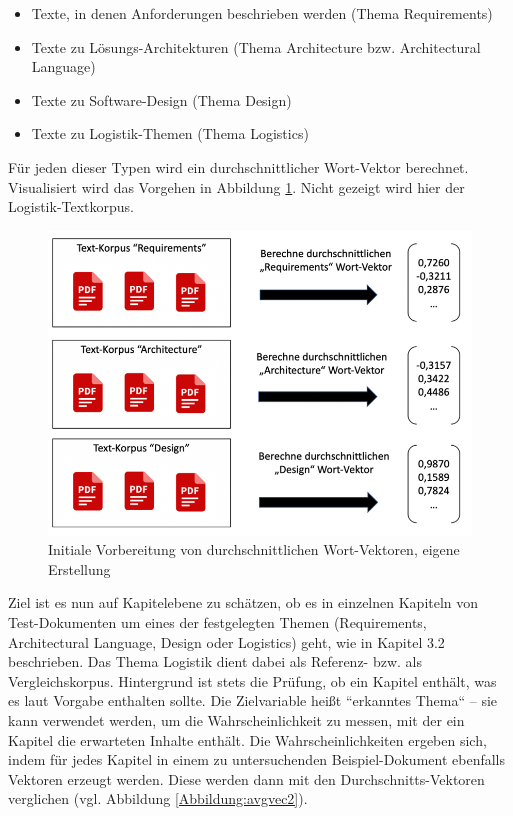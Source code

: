 \begin{itemize}
\item Texte, in denen Anforderungen beschrieben werden (Thema Requirements)
\item Texte zu Lösungs-Architekturen (Thema Architecture bzw. Architectural Language)
\item Texte zu Software-Design (Thema Design) 
\item Texte zu Logistik-Themen (Thema Logistics)
\end{itemize}

Für jeden dieser Typen wird ein durchschnittlicher Wort-Vektor berechnet. Visualisiert wird das Vorgehen in Abbildung \ref{Abbildung:avgvec}. Nicht gezeigt wird hier der Logistik-Textkorpus.

\begin{figure}[h]
\centering
\includegraphics[scale=0.95]{content/pics/Picture_16.png}
\caption{Initiale Vorbereitung von durchschnittlichen Wort-Vektoren, eigene Erstellung}
\label{Abbildung:avgvec}
\end{figure}

Ziel ist es nun auf Kapitelebene zu schätzen, ob es in einzelnen Kapiteln von Test-Dokumenten um eines der festgelegten Themen (Requirements, Architectural Language, Design oder Logistics) geht, wie in Kapitel 3.2 beschrieben. Das Thema Logistik dient dabei als Referenz- bzw. als Vergleichskorpus. Hintergrund ist stets die Prüfung, ob ein Kapitel enthält, was es laut Vorgabe enthalten sollte. Die Zielvariable heißt ``erkanntes Thema`` – sie kann verwendet werden, um die Wahrscheinlichkeit zu messen, mit der ein Kapitel die erwarteten Inhalte enthält. Die Wahrscheinlichkeiten ergeben sich, indem für jedes Kapitel in einem zu untersuchenden Beispiel-Dokument ebenfalls Vektoren erzeugt werden. Diese werden dann mit den Durchschnitts-Vektoren verglichen (vgl. Abbildung \ref{Abbildung:avgvec2}). 

